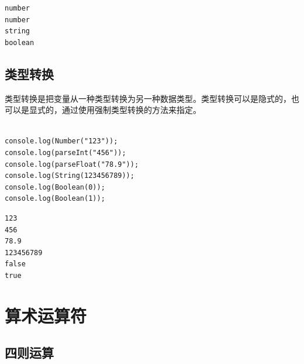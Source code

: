 \begin{tcolorbox}
	\begin{verbatim}
number
number
string
boolean
	\end{verbatim}
\end{tcolorbox}

\vspace{0.5cm}

\subsection{类型转换}

类型转换是把变量从一种类型转换为另一种数据类型。类型转换可以是隐式的，也可以是显式的，通过使用强制类型转换的方法来指定。\\

\\

\begin{lstlisting}[style=htmlcssjs]
console.log(Number("123"));
console.log(parseInt("456"));
console.log(parseFloat("78.9"));
console.log(String(123456789));
console.log(Boolean(0));
console.log(Boolean(1));
\end{lstlisting}

\begin{tcolorbox}
	\begin{verbatim}
123
456
78.9
123456789
false
true
	\end{verbatim}
\end{tcolorbox}

\newpage

\section{算术运算符}

\subsection{四则运算}

\begin{table}[H]
	\centering
	\caption{四则运算}
\end{table}

